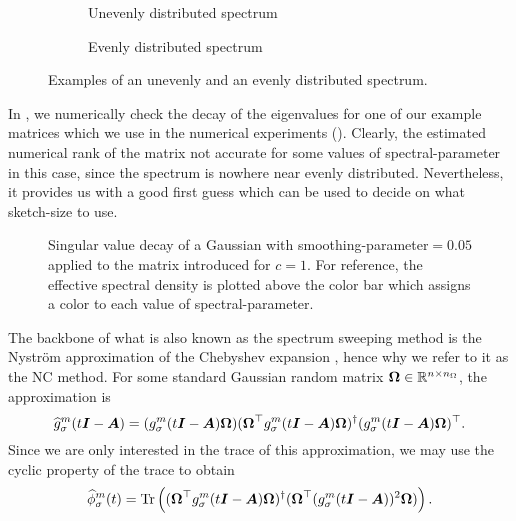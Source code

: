 \begin{figure}[ht]
    \centering
    \begin{subfigure}[t]{0.45\columnwidth}
        
        \caption{Unevenly distributed spectrum}
    \end{subfigure}
    \begin{subfigure}[t]{0.45\columnwidth}
        
        \caption{Evenly distributed spectrum}
    \end{subfigure}      
    \caption{Examples of an unevenly and an evenly distributed spectrum.}
    \label{fig:3-nystrom-evenly-distributed-spectrum}
\end{figure}

In , we numerically check the decay
of the eigenvalues for one of our example matrices which we use in the numerical
experiments (). Clearly, the estimated
numerical rank of the matrix not accurate for some values of \gls{spectral-parameter}
in this case, since the spectrum is
nowhere near evenly distributed. Nevertheless, it provides us with a good first
guess which can be used to decide on what \gls{sketch-size} to use.\\
\begin{figure}[ht]
    \centering
    
    \caption{Singular value decay of a Gaussian 
       with \gls{smoothing-parameter}$=0.05$ applied to the matrix introduced
        for $c=1$. For reference,
       the effective spectral density is plotted above the color bar which
       assigns a color to each value of \gls{spectral-parameter}.}
    \label{fig:3-nystrom-singular-value-decay}
\end{figure}

The backbone of what is also known as the spectrum sweeping method \cite{lin2017randomized}
is the Nystr\"om approximation of the Chebyshev expansion ,
hence why we refer to it as the \gls{NC} method. 
For some standard Gaussian random matrix $\boldsymbol{\Omega} \in \mathbb{R}^{n \times n_{\Omega}}$,
the approximation is
\begin{equation}
    \widehat{g}_{\sigma}^m(t\boldsymbol{I} - \boldsymbol{A})
    = (g_{\sigma}^m(t\boldsymbol{I} - \boldsymbol{A}) \boldsymbol{\Omega}) (\boldsymbol{\Omega}^{\top} g_{\sigma}^m(t\boldsymbol{I} - \boldsymbol{A}) \boldsymbol{\Omega})^{\dagger} (g_{\sigma}^m(t\boldsymbol{I} - \boldsymbol{A}) \boldsymbol{\Omega})^{\top}.
    \label{equ:3-nystrom-nystrom-smoothing-kernel}
\end{equation}
Since we are only interested in the trace of this approximation,
we may use the cyclic property of the trace to obtain
\begin{equation}
    \widehat{\phi}_{\sigma}^m(t)
        = \operatorname{Tr}\left((\boldsymbol{\Omega}^{\top} g_{\sigma}^m(t\boldsymbol{I} - \boldsymbol{A}) \boldsymbol{\Omega})^{\dagger} (\boldsymbol{\Omega}^{\top} (g_{\sigma}^m(t\boldsymbol{I} - \boldsymbol{A}))^2 \boldsymbol{\Omega})\right).
    \label{equ:3-nystrom-spectral-density}
\end{equation}\\

